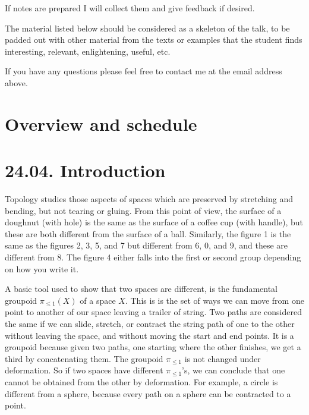 \documentclass[a4paper]{amsart}
\numberwithin{figure}{section}
\theoremstyle{theorem}
\theoremstyle{definition}
\begin{document}
If notes are prepared I will collect them and give feedback if desired.

The material listed below should be considered as a skeleton of the talk, to be padded out with other material from the texts or examples that the student finds interesting, relevant, enlightening, useful, etc.

If you have any questions please feel free to contact me at the email address above.

\section*{Overview and schedule}

\section{24.04. Introduction}

Topology studies those aspects of spaces which are preserved by stretching and bending, but not tearing or gluing. From this point of view, the surface of a doughnut (with hole) is the same as the surface of a coffee cup (with handle), but these are both different from the surface of a ball. Similarly, the figure 1 is the same as the figures 2, 3, 5, and 7 but different from 6, 0, and 9, and these are different from 8. The figure 4 either falls into the first or second group depending on how you write it.

A basic tool used to show that two spaces are different, is the fundamental groupoid $\pi_{\leq 1}(X)$ of a space $X$. This is is the set of ways we can move from one point to another of our space leaving a trailer of string. Two paths are considered the same if we can slide, stretch, or contract the string path of one to the other without leaving the space, and without moving the start and end points. It is a groupoid because given two paths, one starting where the other finishes, we get a third by concatenating them. The groupoid $\pi_{\leq 1}$ is not changed under deformation. So if two spaces have different $\pi_{\leq 1}$'s, we can conclude that one cannot be obtained from the other by deformation. For example, a circle is different from a sphere, because every path on a sphere can be contracted to a point.

\end{document}
